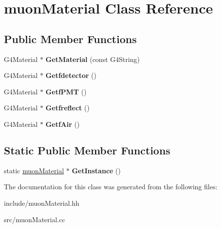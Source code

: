 \hypertarget{classmuonMaterial}{}\section{muon\+Material Class Reference}
\label{classmuonMaterial}
\subsection*{Public Member Functions}
\begin{DoxyCompactItemize}
\item 
\mbox{\label{classmuonMaterial_a86cd49b45dd1042b6ec7aa697197c0b5}} 
G4\+Material $\ast$ {\bfseries Get\+Material} (const G4\+String)
\item 
\mbox{\label{classmuonMaterial_a8621980c58fd47d46f47728850341aa5}} 
G4\+Material $\ast$ {\bfseries Getfdetector} ()
\item 
\mbox{\label{classmuonMaterial_a198ba1027e11cf15bc0118533fff4356}} 
G4\+Material $\ast$ {\bfseries Getf\+P\+MT} ()
\item 
\mbox{\label{classmuonMaterial_a8b1a5528153587650e3990045cae47a1}} 
G4\+Material $\ast$ {\bfseries Getfreflect} ()
\item 
\mbox{\label{classmuonMaterial_a561de210ea339679872c522163990899}} 
G4\+Material $\ast$ {\bfseries Getf\+Air} ()
\end{DoxyCompactItemize}
\subsection*{Static Public Member Functions}
\begin{DoxyCompactItemize}
\item 
\mbox{\label{classmuonMaterial_ac5be4443f4de88103fea67e651cc554b}} 
static \hyperlink{classmuonMaterial}{muon\+Material} $\ast$ {\bfseries Get\+Instance} ()
\end{DoxyCompactItemize}


The documentation for this class was generated from the following files\+:\begin{DoxyCompactItemize}
\item 
include/muon\+Material.\+hh\item 
src/muon\+Material.\+cc\end{DoxyCompactItemize}
